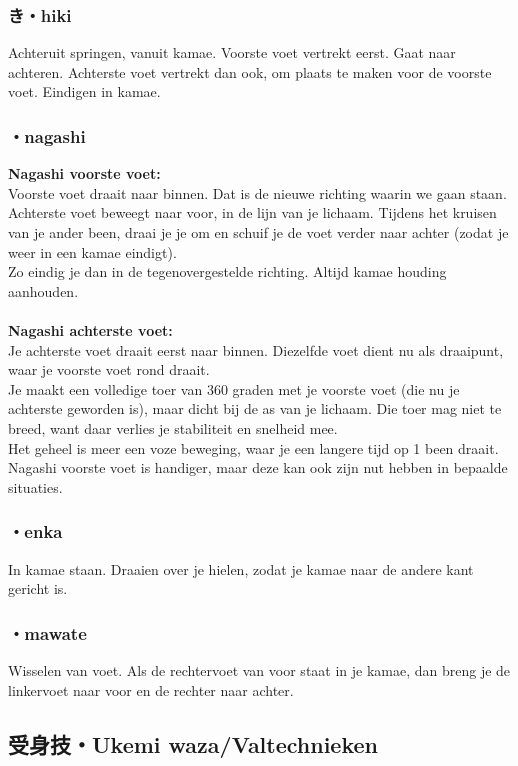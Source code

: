 \subsubsection{き・hiki}
Achteruit springen, vanuit kamae. Voorste voet vertrekt eerst. Gaat naar achteren. Achterste voet vertrekt dan ook, om plaats te maken voor de voorste voet. Eindigen in kamae.

\subsubsection{\ruby{}{}・nagashi}
\textbf{Nagashi voorste voet:}\\
Voorste voet draait naar binnen. Dat is de nieuwe richting waarin we gaan staan.\\Achterste voet beweegt naar voor, in de lijn van je lichaam. Tijdens het kruisen van je ander been, draai je je om en schuif je de voet verder naar achter (zodat je weer in een kamae eindigt).\\
Zo eindig je dan in de tegenovergestelde richting. Altijd kamae houding aanhouden.\\
\\
\textbf{Nagashi achterste voet:}\\
Je achterste voet draait eerst naar binnen. Diezelfde voet dient nu als draaipunt, waar je voorste voet rond draait.\\
Je maakt een volledige toer van 360 graden met je voorste voet (die nu je achterste geworden is), maar dicht bij de as van je lichaam. Die toer mag niet te breed, want daar verlies je stabiliteit en snelheid mee.\\
Het geheel is meer een voze beweging, waar je een langere tijd op 1 been draait. Nagashi voorste voet is handiger, maar deze kan ook zijn nut hebben in bepaalde situaties.

\subsubsection{\ruby{}{}・enka}
In kamae staan. Draaien over je hielen, zodat je kamae naar de andere kant gericht is.

\subsubsection{\ruby{}{}・mawate}
Wisselen van voet. Als de rechtervoet van voor staat in je kamae, dan breng je de linkervoet naar voor en de rechter naar achter.

\subsection{受身技・Ukemi waza/Valtechnieken}
